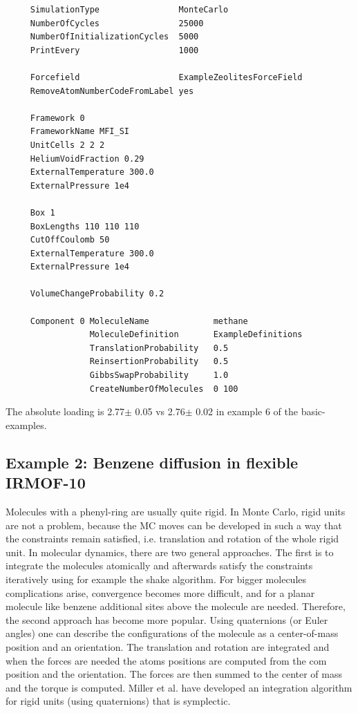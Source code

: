 \begin{tiny}
\begin{verbatim}
     SimulationType                MonteCarlo
     NumberOfCycles                25000
     NumberOfInitializationCycles  5000
     PrintEvery                    1000
     
     Forcefield                    ExampleZeolitesForceField
     RemoveAtomNumberCodeFromLabel yes
     
     Framework 0
     FrameworkName MFI_SI
     UnitCells 2 2 2
     HeliumVoidFraction 0.29
     ExternalTemperature 300.0
     ExternalPressure 1e4
     
     Box 1
     BoxLengths 110 110 110
     CutOffCoulomb 50
     ExternalTemperature 300.0
     ExternalPressure 1e4
     
     VolumeChangeProbability 0.2
     
     Component 0 MoleculeName             methane
                 MoleculeDefinition       ExampleDefinitions
                 TranslationProbability   0.5
                 ReinsertionProbability   0.5
                 GibbsSwapProbability     1.0
                 CreateNumberOfMolecules  0 100
\end{verbatim}
\end{tiny}

The absolute loading is 2.77$\pm$ 0.05 vs 2.76$\pm$ 0.02 in example 6 of the basic-examples.

\subsection*{Example 2: Benzene diffusion in flexible IRMOF-10}

Molecules with a phenyl-ring are usually quite rigid. In Monte Carlo, rigid units are not a problem, because the MC moves can be developed in such a way that the
constraints remain satisfied, i.e. translation and rotation of the whole rigid unit. In molecular dynamics, there are two general approaches. The first is to integrate
the molecules atomically and afterwards satisfy the constraints iteratively using for example the shake algorithm. For bigger molecules complications arise, convergence
becomes more difficult, and for a planar molecule like benzene additional sites above the molecule are needed. Therefore, the second approach has become more popular. 
Using quaternions (or Euler angles) one can describe the configurations of the molecule as a center-of-mass position and an orientation. The translation and rotation
are integrated and when the forces are needed the atoms positions are computed from the com position and the orientation. The forces are then summed to the center of mass
and the torque is computed. Miller et al. have developed an integration algorithm for rigid units (using quaternions) that is symplectic\cite{Miller2002}.

